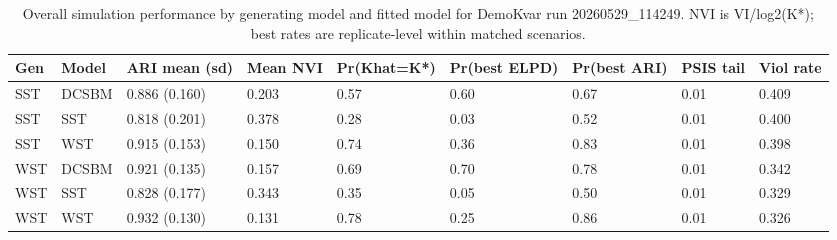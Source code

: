 \begin{table}

\caption{Overall simulation performance by generating model and fitted model for DemoKvar run 20260529_114249. NVI is VI/log2(K*); best rates are replicate-level within matched scenarios.}
\centering
\begin{tabular}[t]{lllllllll}
\toprule
Gen & Model & ARI mean (sd) & Mean NVI & Pr(Khat=K*) & Pr(best ELPD) & Pr(best ARI) & PSIS tail & Viol rate\\
\midrule
SST & DCSBM & 0.886 (0.160) & 0.203 & 0.57 & 0.60 & 0.67 & 0.01 & 0.409\\
SST & SST & 0.818 (0.201) & 0.378 & 0.28 & 0.03 & 0.52 & 0.01 & 0.400\\
SST & WST & 0.915 (0.153) & 0.150 & 0.74 & 0.36 & 0.83 & 0.01 & 0.398\\
WST & DCSBM & 0.921 (0.135) & 0.157 & 0.69 & 0.70 & 0.78 & 0.01 & 0.342\\
WST & SST & 0.828 (0.177) & 0.343 & 0.35 & 0.05 & 0.50 & 0.01 & 0.329\\
\addlinespace
WST & WST & 0.932 (0.130) & 0.131 & 0.78 & 0.25 & 0.86 & 0.01 & 0.326\\
\bottomrule
\end{tabular}
\end{table}
